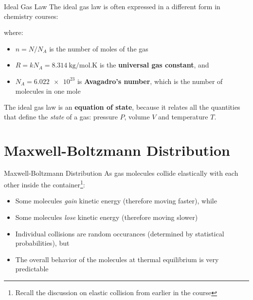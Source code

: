\documentclass[12pt,aspectratio=169]{beamer}
\begin{document}
\begin{frame}{Ideal Gas Law}
  The ideal gas law is often expressed in a different form in chemistry
  courses:  


  \vspace{-.2in}where:
  \begin{itemize}
  \item $n=N/N_A$ is the number of moles of the gas
  \item $R=kN_A=\SI{8.314}{\kilo\gram/\mol.\kelvin}$ is the
    \textbf{universal gas constant}, and
  \item $N_A=\num{6.022e23}$ is \textbf{Avagadro's number}, which is the number
    of molecules in one mole
  \end{itemize}

  \vspace{.1in}The ideal gas law is an \textbf{equation of state}, because it
  relates all the quantities that define the \emph{state} of a gas: pressure
  $P$, volume $V$ and temperature $T$.
\end{frame}



\section{Maxwell-Boltzmann Distribution}

\begin{frame}{Maxwell-Boltzmann Distribution}
  As gas molecules collide elastically with each other inside the
  container\footnote{Recall the discussion on elastic collision from earlier in
    the course}:
  \begin{itemize}
  \item Some molecules \emph{gain} kinetic energy (therefore moving faster),
    while
  \item Some molecules \emph{lose} kinetic energy (therefore moving slower)
  \item Individual collisions are random occurances (determined by statistical
    probabilities), but
  \item The overall behavior of the molecules at thermal equilibrium is very
    predictable
  \end{itemize}
\end{frame}
\end{document}
